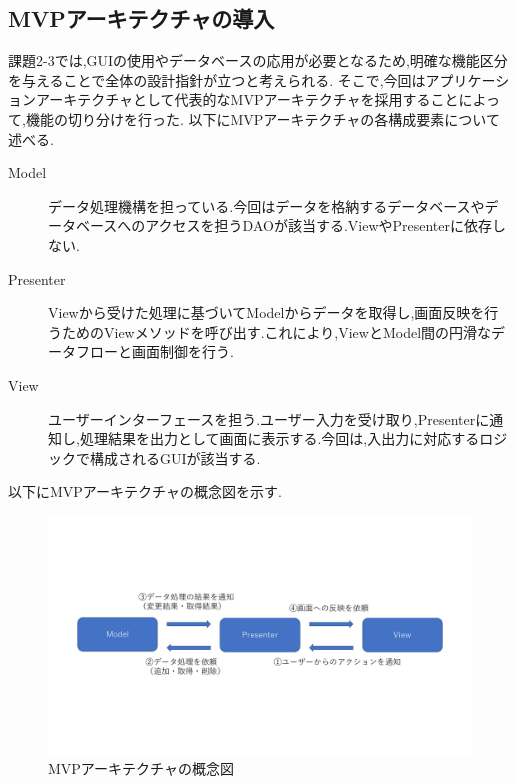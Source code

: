\documentclass[uplatex,12pt]{jsarticle}
\begin{document}
\subsection{MVPアーキテクチャの導入}
課題2-3では,GUIの使用やデータベースの応用が必要となるため,明確な機能区分を与えることで全体の設計指針が立つと考えられる.
そこで,今回はアプリケーションアーキテクチャとして代表的なMVPアーキテクチャを採用することによって,機能の切り分けを行った.
以下にMVPアーキテクチャの各構成要素について述べる.
\begin{description}
\item[Model] データ処理機構を担っている.今回はデータを格納するデータベースやデータベースへのアクセスを担うDAOが該当する.ViewやPresenterに依存しない.
\item[Presenter] Viewから受けた処理に基づいてModelからデータを取得し,画面反映を行うためのViewメソッドを呼び出す.これにより,ViewとModel間の円滑なデータフローと画面制御を行う.
\item[View] ユーザーインターフェースを担う.ユーザー入力を受け取り,Presenterに通知し,処理結果を出力として画面に表示する.今回は,入出力に対応するロジックで構成されるGUIが該当する.
\end{description}
以下にMVPアーキテクチャの概念図を示す.
\begin{figure}[!hbt]
    \centering
    \includegraphics[scale=0.35]{images/mvp_architecture.pdf}
    \caption{MVPアーキテクチャの概念図}
\end{figure}
\end{document}
